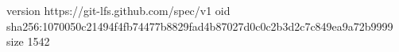 version https://git-lfs.github.com/spec/v1
oid sha256:1070050c21494f4fb74477b8829fad4b87027d0c0c2b3d2c7c849ea9a72b9999
size 1542
